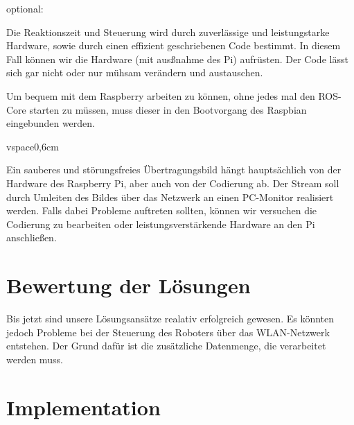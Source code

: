 \documentclass[12pt]{article}
\begin{document}

optional:

Die Reaktionszeit 
und Steuerung %
wird durch zuverlässige und leistungstarke Hardware, sowie durch einen effizient geschriebenen Code bestimmt. In diesem Fall können wir die Hardware (mit ausßnahme des Pi) aufrüsten. Der Code lässt sich gar nicht oder nur mühsam verändern und austauschen.


Um bequem mit dem Raspberry arbeiten zu können, ohne jedes mal den ROS-Core starten zu müssen, muss dieser in den Bootvorgang des Raspbian eingebunden werden.




vspace{0,6cm}

Ein sauberes und störungsfreies Übertragungsbild hängt hauptsächlich von der Hardware des Raspberry Pi, aber auch von der Codierung ab. Der Stream soll durch  Umleiten des Bildes über das Netzwerk an einen PC-Monitor realisiert werden. Falls dabei Probleme auftreten sollten, können wir versuchen die Codierung zu bearbeiten oder leistungsverstärkende Hardware an den Pi anschließen.




\section{Bewertung der Lösungen}

Bis jetzt sind unsere Lösungsansätze realativ erfolgreich gewesen. Es könnten jedoch Probleme bei der Steuerung des Roboters über das WLAN-Netzwerk entstehen. Der Grund dafür ist die zusätzliche Datenmenge, die verarbeitet werden muss. 

\section{Implementation}
\end{document}

